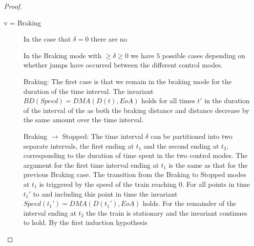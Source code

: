 \begin{mytheorem}
\begin{proof}
\begin{description}
\item[v = Braking]
In the case that $\delta = 0$ there are no 

In the Braking mode with  $\geq \delta \geq 0$ we have $5$ possible cases depending on whether jumps have occurred between the different control modes.

\begin{comment}In the Braking mode there are two cases either $MA.TID.y \wedge Speed > 0$ or $Speed = 0$. Since the train is braking by the definition of $BD$,  $D(t_2) \leq BD(Speed,t_2)$ will continue to hold for any amount of time in this state.  In the case that $MA.TID.y \wedge Speed > 0$ we receive a new movement authority $y$ with $y < EoA$ and a jump is performed to the $Accelerating$ mode with $D(t_2) \leq BD(Speed', t_2) < y$. In the case that $Speed = 0$ a jump occurs to the $Stopped$ state.
\end{comment}

Braking: The first case is that we remain in the braking mode for the duration of the time interval. The invariant $BD(Speed) = DMA(D(t), EoA)$ holds for all times $t'$ in the duration of the interval of the as both the braking distance and distance decrease by the same amount over the time interval.

Braking $\to$ Stopped: The time interval $\delta$ can be partitioned into two separate intervals, the first ending at $t_1$ and the second ending at $t_2$, corresponding to the duration of time spent in the two control modes.  The argument for the first time interval  ending at $t_1$ is the same as that for the previous Braking case. 
The transition from the Braking to Stopped modes at $t_1$ is triggered by the speed of the train reaching $0$. For all points in time $t_1'$ to and including this point in time the invariant $Speed(t_1') = DMA(D(t_1'), EoA)$ holds. For the remainder of the interval ending at $t_2$ the the train is stationary and the invariant continues to hold. By the first induction hypothesis


\begin{comment}
Braking $\to$ Stopped $\to$ Acc: In this case the time interval $\delta$ can be split up into three separate intervals, ending with $t_1,t_2$ and $t_3$  respectively, corresponding to the three control modes. The argument for the first two control modes is the same as the argument for the previous case. 
At the end of the interval $t_2$ a new movement authority $EoA'$ has been granted and all points in time $t_3'$ between $t_2$ and up to including $t_3$ the invariant $BD(Speed(t_3')) < DMA(D(t_3'), EoA')$ since the train has travelled at most one unit of distance during the interval and the movement authority has increased by 50.
\end{comment}



\end{description}
\end{proof}
\end{mytheorem}
